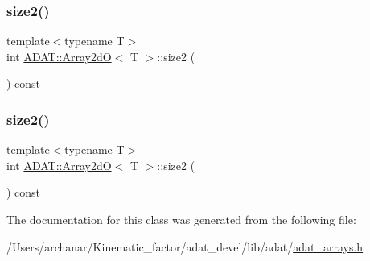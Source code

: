 \mbox{\label{classADAT_1_1Array2dO_a0e743678b1d8c06547715d8929c9b2bf}} 
\subsubsection{\texorpdfstring{size2()}{size2()}\hspace{0.1cm}{\footnotesize\ttfamily [1/2]}}
{\footnotesize\ttfamily template$<$typename T$>$ \\
int \mbox{\hyperlink{classADAT_1_1Array2dO}{A\+D\+A\+T\+::\+Array2dO}}$<$ T $>$\+::size2 (\begin{DoxyParamCaption}{ }\end{DoxyParamCaption}) const\hspace{0.3cm}{\ttfamily [inline]}}

\mbox{\label{classADAT_1_1Array2dO_a0e743678b1d8c06547715d8929c9b2bf}} 
\subsubsection{\texorpdfstring{size2()}{size2()}\hspace{0.1cm}{\footnotesize\ttfamily [2/2]}}
{\footnotesize\ttfamily template$<$typename T$>$ \\
int \mbox{\hyperlink{classADAT_1_1Array2dO}{A\+D\+A\+T\+::\+Array2dO}}$<$ T $>$\+::size2 (\begin{DoxyParamCaption}{ }\end{DoxyParamCaption}) const\hspace{0.3cm}{\ttfamily [inline]}}



The documentation for this class was generated from the following file\+:\begin{DoxyCompactItemize}
\item 
/\+Users/archanar/\+Kinematic\+\_\+factor/adat\+\_\+devel/lib/adat/\mbox{\hyperlink{lib_2adat_2adat__arrays_8h}{adat\+\_\+arrays.\+h}}\end{DoxyCompactItemize}
